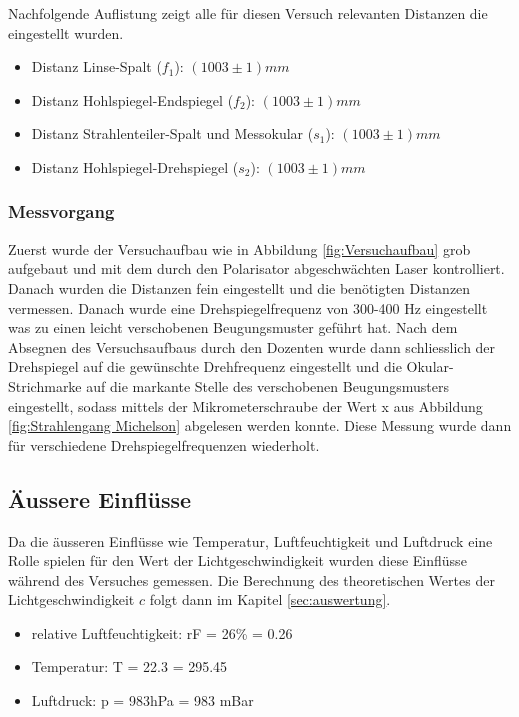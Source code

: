 Nachfolgende Auflistung zeigt alle für diesen Versuch relevanten Distanzen die eingestellt wurden.

\begin{itemize}
\item Distanz Linse-Spalt ($f_{1}$): $(1003\pm 1)mm$
\item Distanz Hohlspiegel-Endspiegel ($f_{2}$): $(1003\pm 1)mm$
\item Distanz Strahlenteiler-Spalt und Messokular ($s_{1}$): $(1003\pm 1)mm$
\item Distanz Hohlspiegel-Drehspiegel ($s_{2}$): $(1003\pm 1)mm$
\end{itemize}

\subsubsection{Messvorgang}

Zuerst wurde der Versuchaufbau wie in Abbildung \ref{fig:Versuchaufbau} grob aufgebaut und mit dem durch den Polarisator abgeschwächten Laser kontrolliert. Danach wurden die Distanzen fein eingestellt und die benötigten Distanzen vermessen. Danach wurde eine Drehspiegelfrequenz von 300-400 Hz eingestellt was zu einen leicht verschobenen Beugungsmuster geführt hat. Nach dem Absegnen des Versuchsaufbaus durch den Dozenten wurde dann schliesslich der Drehspiegel auf die gewünschte Drehfrequenz eingestellt und die Okular-Strichmarke auf die markante Stelle des verschobenen Beugungsmusters eingestellt, sodass mittels der Mikrometerschraube der Wert x aus Abbildung \ref{fig:Strahlengang Michelson} abgelesen werden konnte. Diese Messung wurde dann für verschiedene Drehspiegelfrequenzen wiederholt.

\subsection{Äussere Einflüsse}

Da die äusseren Einflüsse wie Temperatur, Luftfeuchtigkeit und Luftdruck eine Rolle spielen für den Wert der Lichtgeschwindigkeit wurden diese Einflüsse während des Versuches gemessen. Die Berechnung des theoretischen Wertes der Lichtgeschwindigkeit $c$ folgt dann im Kapitel \ref{sec:auswertung}.

\begin{itemize}
\item relative Luftfeuchtigkeit: rF = 26\% = 0.26
\item Temperatur: T = 22.3 = 295.45
\item Luftdruck: p = 983hPa = 983 mBar
\end{itemize}